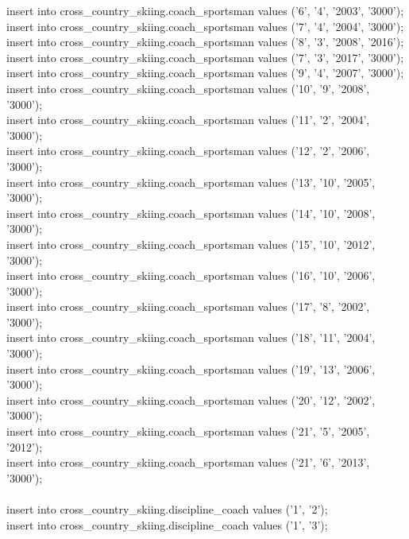\documentclass[a4paper,12pt]{article}
\begin{document}
insert into cross\_country\_skiing.coach\_sportsman values ('6',  '4', '2003',  '3000');\\
insert into cross\_country\_skiing.coach\_sportsman values ('7',  '4', '2004',  '3000');\\
insert into cross\_country\_skiing.coach\_sportsman values ('8',  '3', '2008',  '2016');\\
insert into cross\_country\_skiing.coach\_sportsman values ('7',  '3', '2017',  '3000');\\
insert into cross\_country\_skiing.coach\_sportsman values ('9',  '4', '2007',  '3000');\\
insert into cross\_country\_skiing.coach\_sportsman values ('10', '9', '2008',  '3000');\\
insert into cross\_country\_skiing.coach\_sportsman values ('11', '2', '2004',  '3000');\\
insert into cross\_country\_skiing.coach\_sportsman values ('12', '2', '2006',  '3000');\\
insert into cross\_country\_skiing.coach\_sportsman values ('13', '10',  '2005',  '3000');\\
insert into cross\_country\_skiing.coach\_sportsman values ('14', '10',  '2008',  '3000');\\
insert into cross\_country\_skiing.coach\_sportsman values ('15', '10',  '2012',  '3000');\\
insert into cross\_country\_skiing.coach\_sportsman values ('16', '10',  '2006',  '3000');\\
insert into cross\_country\_skiing.coach\_sportsman values ('17', '8', '2002',  '3000');\\
insert into cross\_country\_skiing.coach\_sportsman values ('18', '11',  '2004',  '3000');\\
insert into cross\_country\_skiing.coach\_sportsman values ('19', '13',  '2006',  '3000');\\
insert into cross\_country\_skiing.coach\_sportsman values ('20', '12',  '2002',  '3000');\\
insert into cross\_country\_skiing.coach\_sportsman values ('21', '5', '2005',  '2012');\\
insert into cross\_country\_skiing.coach\_sportsman values ('21', '6', '2013',  '3000');\\
\\
insert into cross\_country\_skiing.discipline\_coach values ('1', '2');\\
insert into cross\_country\_skiing.discipline\_coach values ('1', '3');\\
\end{document}
